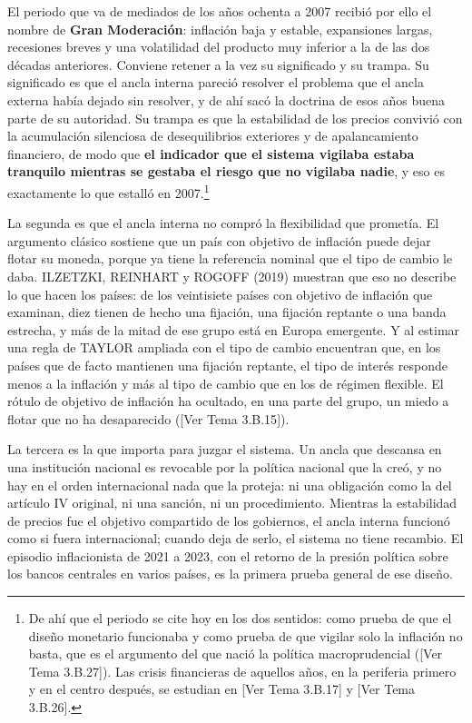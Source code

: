 \documentclass[10pt,a4paper]{article}
\newcommand{\authorfont}[1]{{\fontfamily{EBGaramond-TLF}\selectfont #1}}
\begin{document}
El periodo que va de mediados de los años ochenta a 2007 recibió por ello el nombre de \textbf{Gran Moderación}: inflación baja y estable, expansiones largas, recesiones breves y una volatilidad del producto muy inferior a la de las dos décadas anteriores. Conviene retener a la vez su significado y su trampa. Su significado es que el ancla interna pareció resolver el problema que el ancla externa había dejado sin resolver, y de ahí sacó la doctrina de esos años buena parte de su autoridad. Su trampa es que la estabilidad de los precios convivió con la acumulación silenciosa de desequilibrios exteriores y de apalancamiento financiero, de modo que \textbf{el indicador que el sistema vigilaba estaba tranquilo mientras se gestaba el riesgo que no vigilaba nadie}, y eso es exactamente lo que estalló en 2007.\footnote{%
    De ahí que el periodo se cite hoy en los dos sentidos: como prueba de que el diseño monetario funcionaba y como prueba de que vigilar solo la inflación no basta, que es el argumento del que nació la política macroprudencial ([\authorfont{Ver Tema 3.B.27}]). Las crisis financieras de aquellos años, en la periferia primero y en el centro después, se estudian en [\authorfont{Ver Tema 3.B.17}] y [\authorfont{Ver Tema 3.B.26}].
}

La segunda es que el ancla interna no compró la flexibilidad que prometía. El argumento clásico sostiene que un país con objetivo de inflación puede dejar flotar su moneda, porque ya tiene la referencia nominal que el tipo de cambio le daba. ILZETZKI, REINHART y ROGOFF (2019) muestran que eso no describe lo que hacen los países: de los veintisiete países con objetivo de inflación que examinan, diez tienen de hecho una fijación, una fijación reptante o una banda estrecha, y más de la mitad de ese grupo está en Europa emergente. Y al estimar una regla de TAYLOR ampliada con el tipo de cambio encuentran que, en los países que de facto mantienen una fijación reptante, el tipo de interés responde menos a la inflación y más al tipo de cambio que en los de régimen flexible. El rótulo de objetivo de inflación ha ocultado, en una parte del grupo, un miedo a flotar que no ha desaparecido ([\authorfont{Ver Tema 3.B.15}]).

La tercera es la que importa para juzgar el sistema. Un ancla que descansa en una institución nacional es revocable por la política nacional que la creó, y no hay en el orden internacional nada que la proteja: ni una obligación como la del artículo IV original, ni una sanción, ni un procedimiento. Mientras la estabilidad de precios fue el objetivo compartido de los gobiernos, el ancla interna funcionó como si fuera internacional; cuando deja de serlo, el sistema no tiene recambio. El episodio inflacionista de 2021 a 2023, con el retorno de la presión política sobre los bancos centrales en varios países, es la primera prueba general de ese diseño.
\end{document}
